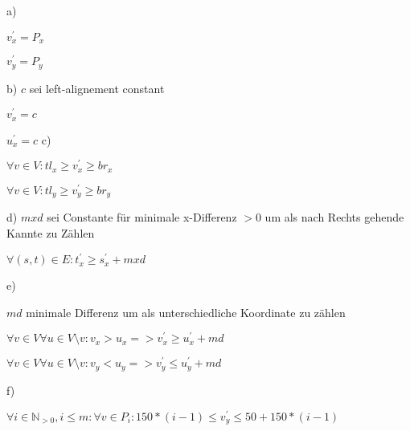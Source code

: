\documentclass{article}
\begin{document}
a)

$v^{\prime}_{x} = P_{x}$

$v^{\prime}_{y} = P_{y}$

b)
$c$ sei left-alignement constant 

$v^{\prime}_{x} = c$

$u^{\prime}_{x} = c$
c)

$\forall v \in V:  tl_{x} \geq v^{\prime}_{x} \geq br_{x}$

$\forall v \in V:  tl_{y} \geq v^{\prime}_{y} \geq br_{y}$

d)
$mxd$ sei Constante für minimale x-Differenz $>0$ um als nach Rechts gehende Kannte zu Zählen

$\forall (s,t) \in E :  t^{\prime}_{x} \geq s^{\prime}_{x} + mxd$

e)

$md$ minimale Differenz um als unterschiedliche Koordinate zu zählen

$\forall v \in V \forall u \in V\setminus{v} : v_{x} > u_{x} => v_{x}^{\prime} \geq u_{x}^{\prime} + md$

$\forall v \in V \forall u \in V\setminus{v} : v_{y} < u_{y} => v_{y}^{\prime} \leq u_{y}^{\prime} + md$

f)

$\forall i \in \mathbb{N}_{>0}, i \leq m:\forall v \in P_{i} : 150*(i-1) \leq v_{y}^{\prime} \leq 50 + 150*(i-1)$
\end{document}
